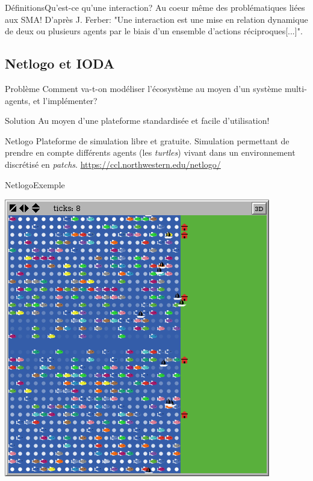 \documentclass[t, 10pt]{beamer}
\begin{document}
	\begin{frame}[c]{Définitions}{Qu'est-ce qu'une interaction?}
		Au coeur même des problématiques liées aux SMA!
		\newline
		\newline
		D'après J. Ferber: "Une interaction est une mise en relation dynamique de deux ou plusieurs agents par le biais d’un ensemble d’actions réciproques[...]".
	\end{frame}
	
	\subsection{Netlogo et IODA}
	
	\begin{frame}[c]
		\begin{alertblock}{Problème}
			Comment va-t-on modéliser l'écosystème au moyen d'un système multi-agents, et l'implémenter?
		\end{alertblock}
		\pause
		\begin{block}{Solution}
			Au moyen d'une plateforme standardisée et facile d'utilisation!
		\end{block}
	\end{frame}
	
	\begin{frame}[c]{Netlogo}
			Plateforme de simulation libre et gratuite.
			\newline
			Simulation permettant de prendre en compte différents agents (les \textit{turtles}) vivant dans un environnement discrétisé en \textit{patchs}.
			\vfill
			\url{https://ccl.northwestern.edu/netlogo/}
	\end{frame}
	
	\begin{frame}[c]{Netlogo}{Exemple}
		\begin{center}
		\includegraphics[scale=0.4]{img/espace.png}
		\end{center}
	\end{frame}
	
\end{document}
